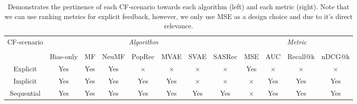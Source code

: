 \begin{table*}[!ht]
\begin{small}
\begin{center}
        \begin{tabular}{c | c c c c c c c | c c c c}
            \toprule
            \multirow{3}{*}{CF-scenario} & \multicolumn{7}{c|}{\emph{Algorithm}} & \multicolumn{4}{c}{\emph{Metric}} \\
            & \multicolumn{7}{c|}{} & \multicolumn{4}{c}{} \\
            & Bias-only & MF & NeuMF & PopRec & MVAE & SVAE & SASRec & MSE & AUC & Recall@k & nDCG@k \\ \midrule
            Explicit & Yes & Yes & Yes & $\times$ & $\times$ & $\times$ & $\times$ & Yes & $\times$ & $\times$ & $\times$ \\[0.6mm]
            Implicit & Yes & Yes & Yes & Yes & Yes & $\times$ & $\times$ & $\times$ & Yes & Yes & Yes \\[0.6mm]
            Sequential & Yes & Yes & Yes & Yes & Yes & Yes & Yes & $\times$ & Yes & Yes & Yes \\[0.6mm]
            \bottomrule
        \end{tabular}
    \end{center}
    \end{small}
    \bigskip
    \caption{Demonstrates the pertinence of each CF-scenario towards each algorithm (left) and each metric (right). Note that we can use ranking metrics for explicit feedback, however, we only use MSE as a design choice and due to it's direct relevance.}
    \label{model_scenario_table}
    \vspace{-6mm} %
\end{table*}